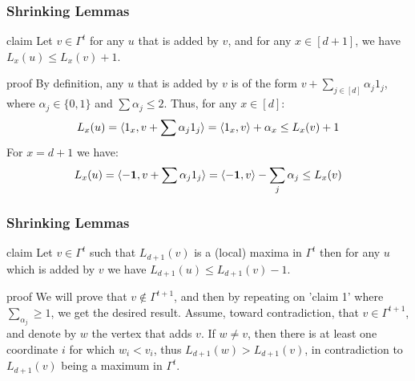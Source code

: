 \documentclass{beamer}
\begin{document}
\begin{frame}
  \frametitle{Shrinking Lemmas} 
  \begin{block}{claim}
  \label{claim:toombound}
Let $v \in \Gamma^{t}$ for any $u$ that is added by $v$, and for any $x \in [d+1]$, we have $L_{x}(u) \le L_{x}(v) + 1$.
\end{block}
\begin{block}{proof}
  By definition, any $u$ that is added by $v$ is of the form $v + \sum_{j \in [d]} \alpha_{j}1_{j}$, where $\alpha_{j} \in \{0,1\}$ and $\sum \alpha_j \le 2$. Thus, for any $x \in [d]$:
  \begin{equation*}
    \begin{split}
      L_{x}(u) = \braket{1_{x}, v + \sum \alpha_{j}1_{j}} = \braket{1_{x},v} +\alpha_{x} \le L_{x}(v) + 1 
    \end{split}
  \end{equation*}
For $x = d+1$ we have: 
  \begin{equation*}
    \begin{split}
      L_{x}(u) = \braket{-\mathbf{1}, v + \sum \alpha_{j}1_{j}} = \braket{-\mathbf{1},v} - \sum_{j}\alpha_{j} \le L_{x}(v) 
    \end{split}
  \end{equation*}
\end{block}
\end{frame}
\begin{frame}
  \frametitle{Shrinking Lemmas} 


  \begin{block}{claim}
  \label{claim:toomb}
  Let $v \in \Gamma^{t}$ such that $L_{d+1}(v)$ is a (local) maxima in $\Gamma^{t}$ then for any $u$ which is added by $v$ we have $L_{d+1}(u) \le L_{d+1}(v) - 1$. 
\end{block}

  \begin{block}{proof}
  We will prove that $v \notin \Gamma^{t+1}$, and then by repeating on 'claim 1' where $\sum_{\alpha_{j}} \ge 1$, we get the desired result. Assume, toward contradiction, that $v \in \Gamma^{t+1}$, and denote by $w$ the vertex that adds $v$. If $w \neq v$, then there is at least one coordinate $i$ for which $w_{i} < v_{i}$, thus $L_{d+1}(w) > L_{d+1}(v)$, in contradiction to $L_{d+1}(v)$ being a maximum in $\Gamma^{t}$.
\end{block}
\end{frame}
\end{document}

